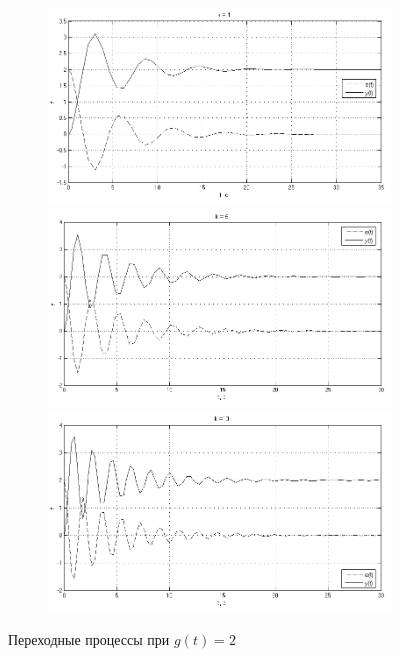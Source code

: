 \documentclass[a4paper, 11pt, russian]{article}
\begin{document}
    \begin{figure}[hp!]
        \centering
        \begin{subfigure}[h]{0.84\textwidth}
            \includegraphics[width = \textwidth]{constInput1ast1k.png}\\
            \includegraphics[width = \textwidth]{constInput1ast5k.png}\\
            \includegraphics[width = \textwidth]{constInput1ast10k.png}
        \end{subfigure}
        \caption{Переходные процессы при $g(t) = 2$}
    \end{figure}
    \clearpage
\end{document}
